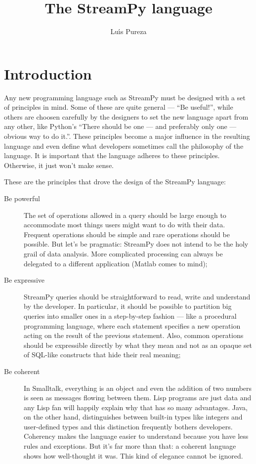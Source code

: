 \documentclass[twoside]{report}
\begin{document}
\title{The StreamPy language}
\author{Lu\'{\i}s Pureza}

\maketitle

\chapter{Introduction}
Any new programming language such as StreamPy must be designed with a set of principles in mind. Some of these are quite general --- ``Be useful!'', while others are choosen carefully by the designers to set the new language apart from any other, like Python's ``There should be one --- and preferably only one --- obvious way to do it.''. These principles become a major influence in the resulting language and even define what developers sometimes call the philosophy of the language. It is important that the language adheres to these principles. Otherwise, it just won't make sense.

These are the principles that drove the design of the StreamPy language:

\begin{description}
\item[Be powerful] The set of operations allowed in a query should be large enough to accommodate most things users might want to do with their data. Frequent operations should be simple and rare operations should be possible. But let's be pragmatic: StreamPy does not intend to be the holy grail of data analysis. More complicated processing can always be delegated to a different application (Matlab comes to mind);
\item[Be expressive] StreamPy queries should be straightforward to read, write and understand by the developer. In particular, it should be possible to partition big queries into smaller ones in a step-by-step fashion --- like a procedural programming language, where each statement specifies a new operation acting on the result of the previous statement. Also, common operations should be expressible directly by what they mean and not as an opaque set of SQL-like constructs that hide their real meaning;
\item[Be coherent] In Smalltalk, everything is an object and even the addition of two numbers is seen as messages flowing between them. Lisp programs are just data and any Lisp fan will happily explain why that has so many advantages. Java, on the other hand, distinguishes between built-in types like integers and user-defined types and this distinction frequently bothers developers. Coherency makes the language easier to understand because you have less rules and exceptions. But it's far more than that: a coherent language shows how well-thought it was. This kind of elegance cannot be ignored.
\end{description}
\end{document}
